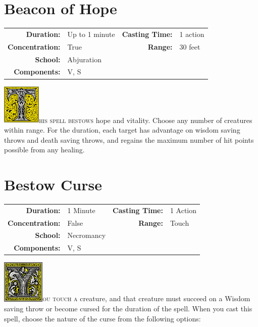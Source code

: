 \documentclass[12pt,showtrims]{memoir}
\begin{document}
\section*{Beacon of Hope}

{
\small\centering\vspace{-6pt}
\begin{tabular}{rlrl}
\toprule

\textbf{Duration:} & Up to 1 minute &
\textbf{Casting Time:} & 1 action \\
\textbf{Concentration:} & True &
\textbf{Range:} & 30 feet \\
\textbf{School:} & Abjuration \\
\textbf{Components:} & \multicolumn{3}{p{0.7\textwidth}}{V, S}\\

\bottomrule
\end{tabular}
}

\vspace{1\baselineskip}\noindent 
\lettrine[lines=4]{\includegraphics[height=54pt]{initials/T.png}}{his spell bestows} hope and vitality. Choose any number of creatures within range. For the duration, each target has advantage on wisdom saving throws and death saving throws, and regains the maximum number of hit points possible from any healing.
\newpage
{}
\newpage
\section*{Bestow Curse}
{
\small\centering\vspace{-6pt}
\begin{tabular}{rlrl}
\toprule

\textbf{Duration:} & 1 Minute &
\textbf{Casting Time:} & 1 Action \\
\textbf{Concentration:} & False &
\textbf{Range:} & Touch \\
\textbf{School:} & Necromancy \\
\textbf{Components:} & \multicolumn{3}{p{0.7\textwidth}}{V, S}\\

\bottomrule
\end{tabular}
}
\vspace{1\baselineskip}\noindent
\lettrine[lines=4]{\includegraphics[height=58pt]{initials/Y.png}}{ou touch a} creature, and that creature must succeed on a Wisdom saving throw or become cursed for the duration of the spell. When you cast this spell, choose the nature of the curse from the following options:
\end{document}

